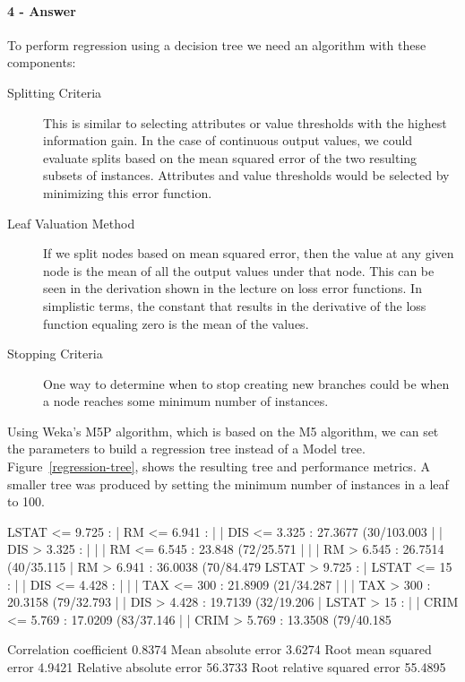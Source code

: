 \documentclass[10pt,letter]{article}
\begin{document}
\paragraph{4 - Answer}

To perform regression using a decision tree we need an algorithm with these components:

\begin{description}
    \item[Splitting Criteria] This is similar to selecting attributes or value thresholds with the highest information gain. In the case of continuous output values, we could evaluate splits based on the mean squared error of the two resulting subsets of instances. Attributes and value thresholds would be selected by minimizing this error function.
    \item [Leaf Valuation Method] If we split nodes based on mean squared error, then the value at any given node is the mean of all the output values under that node. This can be seen in the derivation shown in the lecture on loss error functions. In simplistic terms, the constant that results in the derivative of the loss function equaling zero is the mean of the values.
    \item [Stopping Criteria] One way to determine when to stop creating new branches could be when a node reaches some minimum number of instances.
\end{description}

Using Weka's M5P algorithm, which is based on the M5 algorithm, we can set the parameters to build a regression tree instead of a Model tree. Figure~\ref{regression-tree}, shows the resulting tree and performance metrics. A smaller tree was produced by setting the minimum number of instances in a leaf to 100.

\scriptsize
\begin{verbbox}
LSTAT <= 9.725 : 
|   RM <= 6.941 : 
|   |   DIS <= 3.325 : 27.3677 (30/103.003%
|   |   DIS >  3.325 : 
|   |   |   RM <= 6.545 : 23.848 (72/25.571%
|   |   |   RM >  6.545 : 26.7514 (40/35.115%
|   RM >  6.941 : 36.0038 (70/84.479%
LSTAT >  9.725 : 
|   LSTAT <= 15 : 
|   |   DIS <= 4.428 : 
|   |   |   TAX <= 300 : 21.8909 (21/34.287%
|   |   |   TAX >  300 : 20.3158 (79/32.793%
|   |   DIS >  4.428 : 19.7139 (32/19.206%
|   LSTAT >  15 : 
|   |   CRIM <= 5.769 : 17.0209 (83/37.146%
|   |   CRIM >  5.769 : 13.3508 (79/40.185%


Correlation coefficient                  0.8374
Mean absolute error                      3.6274
Root mean squared error                  4.9421
Relative absolute error                 56.3733 %
Root relative squared error             55.4895 %

\end{verbbox}
\normalsize
\end{document}
